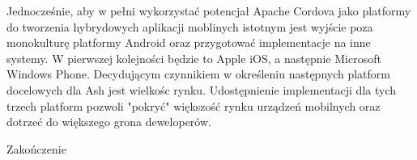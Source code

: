 \documentclass[brudnopis]{xmgr}
\begin{document}
Jednocześnie, aby w pełni wykorzystać potencjał Apache Cordova jako platformy do tworzenia hybrydowych aplikacji moblinych istotnym jest wyjście poza monokulturę platformy Android oraz przygotować implementacje na inne systemy. W pierwszej kolejności będzie to Apple iOS, a następnie Microsoft Windows Phone. Decydującym czynnikiem w określeniu następnych platform docelowych dla Ash jest wielkośc rynku. Udostępnienie implementacji dla tych trzech platform pozwoli "pokryć" większość rynku urządzeń mobilnych oraz dotrzeć do większego grona deweloperów. 

\summary

Zakończenie

\appendix






\oswiadczenie
\end{document}

